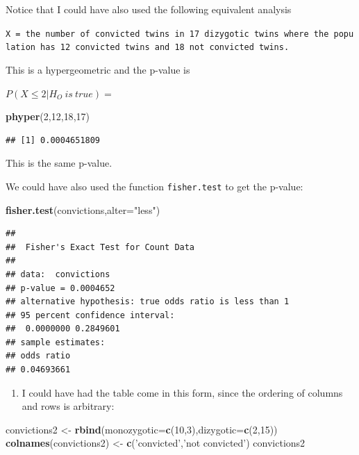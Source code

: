 \documentclass[]{book}
\newenvironment{Shaded}{\begin{snugshade}}{\end{snugshade}}
\newcommand{\KeywordTok}[1]{\textcolor[rgb]{0.13,0.29,0.53}{\textbf{#1}}}
\newcommand{\DataTypeTok}[1]{\textcolor[rgb]{0.13,0.29,0.53}{#1}}
\newcommand{\DecValTok}[1]{\textcolor[rgb]{0.00,0.00,0.81}{#1}}
\newcommand{\StringTok}[1]{\textcolor[rgb]{0.31,0.60,0.02}{#1}}
\newcommand{\NormalTok}[1]{#1}
\providecommand{\tightlist}{%
  \setlength{\itemsep}{0pt}\setlength{\parskip}{0pt}}
\theoremstyle{definition}
\theoremstyle{definition}
\theoremstyle{definition}
\theoremstyle{remark}
\begin{document}
Notice that I could have also used the following equivalent analysis

\texttt{X\ =\ the\ number\ of\ convicted\ twins\ in\ 17\ dizygotic\ twins\ where\ the\ population\ has\ 12\ convicted\ twins\ and\ 18\ not\ convicted\ twins.}

This is a hypergeometric and the p-value is

\(P(X \leq 2|H_{O} \: is \: true) =\)

\begin{Shaded}
\begin{Highlighting}[]
\KeywordTok{phyper}\NormalTok{(}\DecValTok{2}\NormalTok{,}\DecValTok{12}\NormalTok{,}\DecValTok{18}\NormalTok{,}\DecValTok{17}\NormalTok{)}
\end{Highlighting}
\end{Shaded}

\begin{verbatim}
## [1] 0.0004651809
\end{verbatim}

This is the same p-value.

We could have also used the function \texttt{fisher.test} to get the
p-value:

\begin{Shaded}
\begin{Highlighting}[]
\KeywordTok{fisher.test}\NormalTok{(convictions,}\DataTypeTok{alter=}\StringTok{"less"}\NormalTok{)}
\end{Highlighting}
\end{Shaded}

\begin{verbatim}
## 
##  Fisher's Exact Test for Count Data
## 
## data:  convictions
## p-value = 0.0004652
## alternative hypothesis: true odds ratio is less than 1
## 95 percent confidence interval:
##  0.0000000 0.2849601
## sample estimates:
## odds ratio 
## 0.04693661
\end{verbatim}

\begin{enumerate}
\def\labelenumi{\arabic{enumi}.}
\setcounter{enumi}{1}
\tightlist
\item
  I could have had the table come in this form, since the ordering of
  columns and rows is arbitrary:
\end{enumerate}

\begin{Shaded}
\begin{Highlighting}[]
\NormalTok{convictions2 <-}\StringTok{ }\KeywordTok{rbind}\NormalTok{(}\DataTypeTok{monozygotic=}\KeywordTok{c}\NormalTok{(}\DecValTok{10}\NormalTok{,}\DecValTok{3}\NormalTok{),}\DataTypeTok{dizygotic=}\KeywordTok{c}\NormalTok{(}\DecValTok{2}\NormalTok{,}\DecValTok{15}\NormalTok{))}
\KeywordTok{colnames}\NormalTok{(convictions2) <-}\StringTok{ }\KeywordTok{c}\NormalTok{(}\StringTok{'convicted'}\NormalTok{,}\StringTok{'not convicted'}\NormalTok{)}
\NormalTok{convictions2}
\end{Highlighting}
\end{Shaded}
\end{document}
